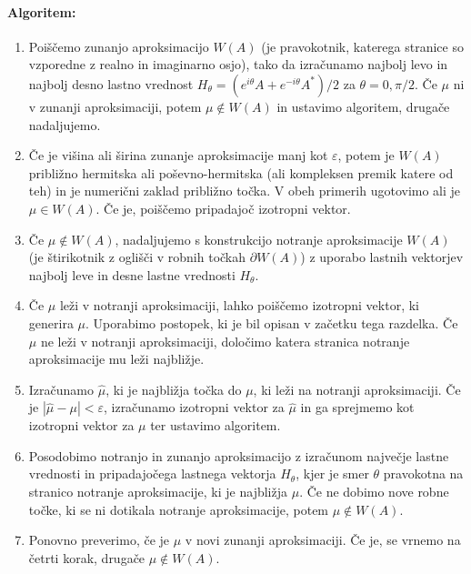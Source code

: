 \documentclass[12pt,a4paper]{amsart}
\theoremstyle{definition}
\theoremstyle{plain}
\newcommand{\abs}[1]{ \left\lvert#1\right\rvert}
\begin{document}
\paragraph{Algoritem:}
\begin{enumerate}[1.]
\item Poiščemo zunanjo aproksimacijo $W(A)$ (je pravokotnik, katerega stranice so vzporedne z realno in imaginarno osjo), tako da izračunamo najbolj levo in najbolj desno lastno vrednost $H_\theta =(e^{i\theta}A+e^{-i\theta}A^\ast)/2$ za $\theta =0, \pi/2$. %
Če $\mu$ ni v zunanji aproksimaciji, potem $\mu \not \in W(A)$ in ustavimo algoritem, drugače nadaljujemo.
\item Če je višina ali širina zunanje aproksimacije manj kot $\varepsilon$, potem je $W(A)$ približno hermitska ali poševno-hermitska (ali kompleksen premik katere od teh) in je numerični zaklad približno točka. V obeh primerih ugotovimo ali je $\mu \in W(A)$. Če je, poiščemo pripadajoč izotropni vektor. 
\item Če $\mu \not \in W(A)$, nadaljujemo s konstrukcijo notranje aproksimacije $W(A)$ (je štirikotnik z oglišči v robnih točkah $\partial W(A)$) z uporabo lastnih vektorjev najbolj leve in desne lastne vrednosti $H_{\theta}$.%
\item  Če $\mu$ leži v notranji aproksimaciji, lahko poiščemo izotropni vektor, ki generira $\mu$. Uporabimo postopek, ki je bil opisan v začetku tega razdelka. %
Če $\mu$ ne leži v notranji aproksimaciji, določimo katera stranica notranje aproksimacije mu leži najbližje.
\item  Izračunamo $\hat{\mu}$, ki je najbližja točka do $\mu$, ki leži na notranji aproksimaciji. Če je $\abs{\hat{\mu}-\mu}<\varepsilon$, izračunamo izotropni vektor za $\hat{\mu}$ in ga sprejmemo kot izotropni vektor za $\mu$ ter ustavimo algoritem.
\item Posodobimo notranjo in zunanjo aproksimacijo z izračunom največje lastne vrednosti in pripadajočega lastnega vektorja $H_{\theta}$, kjer je smer $\theta$ pravokotna na stranico notranje aproksimacije, ki je najbližja $\mu$. Če ne dobimo nove robne točke, ki se ni dotikala notranje aproksimacije, potem $\mu \not \in W(A)$. 
\item Ponovno preverimo, če je $\mu$  v novi zunanji aproksimaciji. Če je, se vrnemo na četrti korak, drugače $\mu \not \in W(A)$. 
\end{enumerate}
\end{document}
